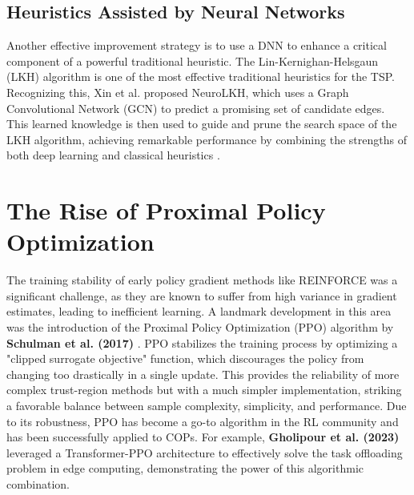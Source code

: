 \subsection{Heuristics Assisted by Neural Networks}
Another effective improvement strategy is to use a DNN to enhance a critical component of a powerful traditional heuristic. The Lin-Kernighan-Helsgaun (LKH) algorithm is one of the most effective traditional heuristics for the TSP. Recognizing this, Xin et al. proposed NeuroLKH, which uses a Graph Convolutional Network (GCN) to predict a promising set of candidate edges. This learned knowledge is then used to guide and prune the search space of the LKH algorithm, achieving remarkable performance by combining the strengths of both deep learning and classical heuristics \cite{wangSolvingCombinatorialOptimization2024}.

\section{The Rise of Proximal Policy Optimization}
The training stability of early policy gradient methods like REINFORCE was a significant challenge, as they are known to suffer from high variance in gradient estimates, leading to inefficient learning. A landmark development in this area was the introduction of the Proximal Policy Optimization (PPO) algorithm by \textbf{Schulman et al. (2017)} \cite{schulmanProximalPolicyOptimization2017}. PPO stabilizes the training process by optimizing a "clipped surrogate objective" function, which discourages the policy from changing too drastically in a single update. This provides the reliability of more complex trust-region methods but with a much simpler implementation, striking a favorable balance between sample complexity, simplicity, and performance. Due to its robustness, PPO has become a go-to algorithm in the RL community and has been successfully applied to COPs. For example, \textbf{Gholipour et al. (2023)} \cite{gholipourTPTOTransformerPPOBased2023} leveraged a Transformer-PPO architecture to effectively solve the task offloading problem in edge computing, demonstrating the power of this algorithmic combination.


